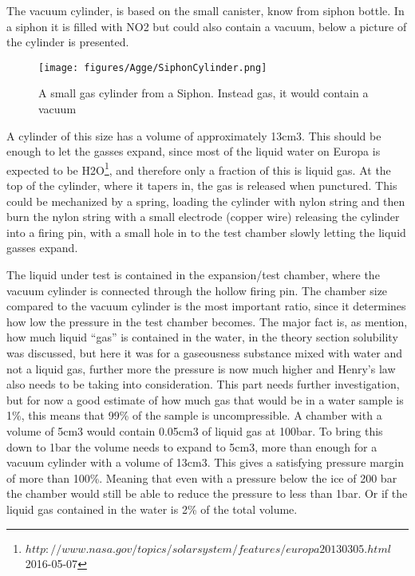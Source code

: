 \documentclass[10pt,a4paper,draft]{report}
\begin{document}
The vacuum cylinder, is based on the small canister, know from siphon bottle. In a siphon it is filled with NO2 but could also contain a vacuum, below a picture of the cylinder is presented.
	

\begin{figure}[H]
\caption{A small gas cylinder from a Siphon. Instead gas, it would contain a vacuum}
\centering
\texttt{[image: figures/Agge/SiphonCylinder.png]}   
\end{figure}

A cylinder of this size has a volume of approximately 13cm3. This should be enough to let the gasses expand, since most of the liquid water on Europa is expected to be H2O\footnote{$http://www.nasa.gov/topics/solarsystem/features/europa20130305.html$ 2016-05-07}, and therefore only a fraction of this is liquid gas. At the top of the cylinder, where it tapers in, the gas is released when punctured. This could be mechanized by a spring, loading the cylinder with nylon string and then burn the nylon string with a small electrode (copper wire) releasing the cylinder into a firing pin, with a small hole in to the test chamber slowly letting the liquid gasses expand. \par
The liquid under test is contained in the expansion/test chamber, where the vacuum cylinder is connected through the hollow firing pin. The chamber size compared to the vacuum cylinder is the most important ratio, since it determines how low the pressure in the test chamber becomes. The major fact is, as mention, how much liquid “gas” is contained in the water, in the theory section solubility was discussed, but here it was for a gaseousness substance mixed with water and not a liquid gas, further more the pressure is now much higher and Henry’s law also needs to be taking into consideration. This part needs further investigation, but for now a good estimate of how much gas that would be in a water sample is 1\%, this means that 99\% of the sample is uncompressible. A chamber with a volume of 5cm3 would contain 0.05cm3 of liquid gas at 100bar. To bring this down to 1bar the volume needs to expand to 5cm3, more than enough for a vacuum cylinder with a volume of 13cm3. This gives a satisfying pressure margin of more than 100\%. Meaning that even with a pressure below the ice of 200 bar the chamber would still be able to reduce the pressure to less than 1bar. Or if the liquid gas contained in the water is 2\% of the total volume.     \par
\end{document}
